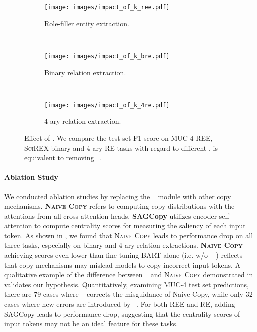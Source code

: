 \documentclass[11pt]{article}
\begin{document}
\begin{figure*}[t]
    \centering
    \begin{subfigure}[t]{0.31\textwidth}

    \texttt{[image: images/impact\_of\_k\_ree.pdf]}
    \caption{Role-filler entity extraction.}
    \end{subfigure}
    ~
    \begin{subfigure}[t]{0.31\textwidth}
    \texttt{[image: images/impact\_of\_k\_bre.pdf]}
    \caption{Binary relation extraction.}
    \end{subfigure}
    ~
    \begin{subfigure}[t]{0.31\textwidth}
    \texttt{[image: images/impact\_of\_k\_4re.pdf]}
    \caption{4-ary relation extraction.}
    \end{subfigure}
    
    \caption{Effect of . We compare the test set F1 score on MUC-4 REE, \textsc{SciREX} binary and 4-ary RE tasks with regard to different .  is equivalent to removing \topkcopy~.}
    \label{fig:effect_of_k}
    \vspace{-5mm}
\end{figure*}

\paragraph{Ablation Study} We conducted ablation studies by replacing the \topkcopy~ module with other copy mechanisms. \textbf{\textsc{Naive Copy}} refers to computing copy distributions with the attentions from all cross-attention heads. \textbf{SAGCopy} \cite{xu-etal-2020-self} utilizes encoder self-attention to compute centrality scores for measuring the saliency of each input token. As shown in , we found that \textsc{Naive Copy} leads to performance drop on all three tasks, especially on binary and 4-ary relation extractions. \textbf{\textsc{Naive Copy}} achieving scores even lower than fine-tuning \textsc{BART} alone (i.e. w/o \topkcopy~ ) reflects that copy mechanisms may mislead models to copy incorrect input tokens. A qualitative example of the difference between \topkcopy~ and \textsc{Naive Copy} demonstrated in  validates our hypothesis. Quantitatively, examining MUC-4 test set predictions, there are 79 cases where \topkcopy~ corrects the misguidance of Naive Copy, while only 32 cases where new errors are introduced by \topkcopy~. For both REE and RE, adding SAGCopy leads to performance drop, suggesting that the centrality scores of input tokens may not be an ideal feature for these tasks. 
\end{document}
